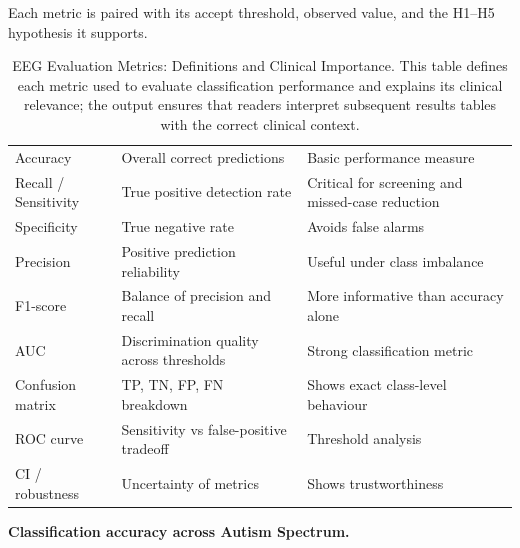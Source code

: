 \noindent Each metric is paired with its accept threshold, observed value, and the H1--H5 hypothesis it supports.
{\tablestripes\tablefontsize
{}
\begin{xltabular}{\textwidth}{@{} l L L @{}}
\caption[EEG Evaluation Metrics: Definitions and Clinical Importance]{EEG Evaluation Metrics: Definitions and Clinical Importance. This table defines each metric used to evaluate classification performance and explains its clinical relevance; the output ensures that readers interpret subsequent results tables with the correct clinical context.}\label{tab:eeg_evaluation_metrics} \\
\toprule
{} &  &  \\
\midrule
\endfirsthead
\endhead
\bottomrule
\endlastfoot
Accuracy & Overall correct predictions & Basic performance measure \\
Recall / Sensitivity & True positive detection rate & Critical for screening and missed-case reduction \\
Specificity & True negative rate & Avoids false alarms \\
Precision & Positive prediction reliability & Useful under class imbalance \\
F1-score & Balance of precision and recall & More informative than accuracy alone \\
AUC & Discrimination quality across thresholds & Strong classification metric \\
Confusion matrix & TP, TN, FP, FN breakdown & Shows exact class-level behaviour \\
ROC curve & Sensitivity vs false-positive tradeoff & Threshold analysis \\
CI / robustness & Uncertainty of metrics & Shows trustworthiness \\
\end{xltabular}}
\fi %


\noindent\textbf{Classification accuracy across Autism Spectrum.}

